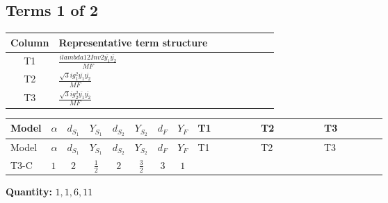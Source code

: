 \documentclass[8pt]{article}
\begin{document}
\begin{landscape}
\subsection*{Terms 1 of 2}
\begin{center}
\begin{tabular}{@{}c >{\raggedright\arraybackslash}p{0.82\linewidth}@{}}
\toprule
Column & Representative term structure \\
\midrule
T1 & \(\displaystyle \frac{i lambda12Inv2 \overline{y_{1}} \overline{y_{2}}}{MF}\) \\
\midrule
T2 & \(\displaystyle \frac{\sqrt{3} i g_{1}^{2} \overline{y_{1}} \overline{y_{2}}}{MF}\) \\
\midrule
T3 & \(\displaystyle \frac{\sqrt{3} i g_{2}^{2} \overline{y_{1}} \overline{y_{2}}}{MF}\) \\
\midrule
\bottomrule
\end{tabular}
\end{center}
\smallskip
\tiny
\begin{longtable}{@{}llcccccc >{\raggedright\arraybackslash}p{0.21\linewidth} >{\raggedright\arraybackslash}p{0.21\linewidth} >{\raggedright\arraybackslash}p{0.21\linewidth}@{}}
\toprule
Model & $\alpha$ & $d_{S_1}$ & $Y_{S_1}$ & $d_{S_2}$ & $Y_{S_2}$ & $d_F$ & $Y_F$ & T1 & T2 & T3 \\
\midrule
\endfirsthead
\toprule
Model & $\alpha$ & $d_{S_1}$ & $Y_{S_1}$ & $d_{S_2}$ & $Y_{S_2}$ & $d_F$ & $Y_F$ & T1 & T2 & T3 \\
\midrule
\endhead
T3-C & $1$ & $2$ & $\frac{1}{2}$ & $2$ & $\frac{3}{2}$ & $3$ & $1$ & \scriptsize\adjustbox{max width=\linewidth}{$\begin{gathered} - \frac{i lambda12Inv2 \overline{y_{1}} \overline{y_{2}}}{3 MF}\end{gathered}$} & \scriptsize\adjustbox{max width=\linewidth}{$\begin{gathered} - \frac{\sqrt{3} i g_{1}^{2} \overline{y_{1}} \overline{y_{2}}}{2 MF}\end{gathered}$} & \scriptsize\adjustbox{max width=\linewidth}{$\begin{gathered} - \frac{\sqrt{3} i g_{2}^{2} \overline{y_{1}} \overline{y_{2}}}{4 MF}\end{gathered}$} \\
\midrule
\bottomrule
\end{longtable}
\clearpage
\noindent\textbf{Quantity: }$\mathrm{1,1,6,11}$\par\smallskip

\end{landscape}
\end{document}
